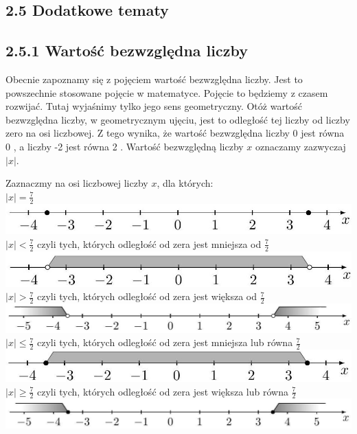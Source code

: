 \documentclass[10pt]{article}
\begin{document}
\subsection*{2.5 Dodatkowe tematy}
\subsection*{2.5.1 Wartość bezwzględna liczby}
Obecnie zapoznamy się z pojęciem wartość bezwzględna liczby. Jest to powszechnie stosowane pojęcie w matematyce. Pojęcie to będziemy z czasem rozwijać. Tutaj wyjaśnimy tylko jego sens geometryczny. Otóż wartość bezwzględna liczby, w geometrycznym ujęciu, jest to odległość tej liczby od liczby zero na osi liczbowej. Z tego wynika, że wartość bezwzględna liczby 0 jest równa 0 , a liczby -2 jest równa 2 . Wartość bezwzględną liczby \(x\) oznaczamy zazwyczaj \(|x|\).

Zaznaczmy na osi liczbowej liczby \(x\), dla których:\\
\(|x|=\frac{7}{2}\)\\
\includegraphics[max width=\textwidth, center]{2024_11_21_8f01584889ff06348ae7g-046(2)}\\
\(|x|<\frac{7}{2}\) czyli tych, których odległość od zera jest mniejsza od \(\frac{7}{2}\)\\
\includegraphics[max width=\textwidth, center]{2024_11_21_8f01584889ff06348ae7g-046(3)}\\
\(|x|>\frac{7}{2}\) czyli tych, których odległość od zera jest większa od \(\frac{7}{2}\)\\
\includegraphics[max width=\textwidth, center]{2024_11_21_8f01584889ff06348ae7g-046(1)}\\
\(|x| \leqslant \frac{7}{2}\) czyli tych, których odległość od zera jest mniejsza lub równa \(\frac{7}{2}\)\\
\includegraphics[max width=\textwidth, center]{2024_11_21_8f01584889ff06348ae7g-046}\\
\(|x| \geqslant \frac{7}{2}\) czyli tych, których odległość od zera jest większa lub równa \(\frac{7}{2}\)\\
\includegraphics[max width=\textwidth, center]{2024_11_21_8f01584889ff06348ae7g-047}
\end{document}

